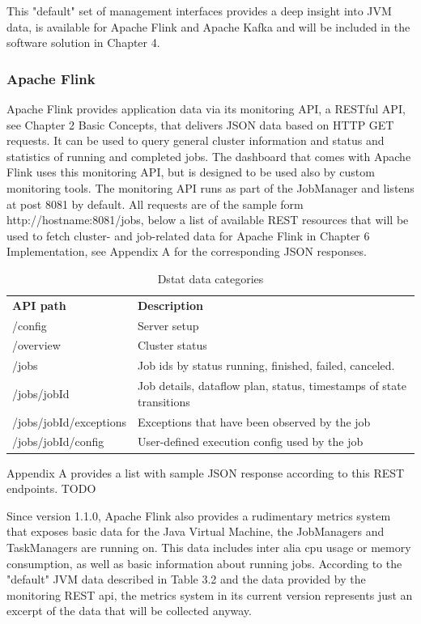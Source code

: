 This "default" set of management interfaces provides a deep insight into JVM data, is
available for Apache Flink and Apache Kafka and will be included in the software solution
in Chapter 4.

\subsubsection{Apache Flink}

Apache Flink provides application data via its monitoring API, a RESTful API, see
Chapter 2 Basic Concepts, that delivers JSON data based on HTTP
GET requests. It can be used to query general cluster information and status and
statistics of running and completed jobs. The dashboard that comes with Apache Flink
uses this monitoring API, but is designed to be used also by custom monitoring tools. The
monitoring API runs as part of the JobManager and listens at post 8081 by default. All requests
are of the sample form http://hostname:8081/jobs, below a list of available REST resources that
will be used to fetch cluster- and job-related data for Apache Flink in Chapter 6 Implementation,
see Appendix A for the corresponding JSON responses.

\begin{table}[H]
    \begin{tabular}{ll}
        \textbf{API path} & \textbf{Description} \\
        /config & Server setup \\
        /overview & Cluster status \\
        /jobs & Job ids by status running, finished, failed, canceled. \\
        /jobs/{jobId} & Job details, dataflow plan, status, timestamps of state transitions \\
        /jobs/{jobId}/exceptions &  Exceptions that have been observed by the job \\
        /jobs/{jobId}/config & User-defined execution config used by the job \\
    \end{tabular}
    \caption{Dstat data categories}
    \label{tbl:dstatcategories}
\end{table}

Appendix A provides a list with sample JSON response according to this REST endpoints. TODO

Since version 1.1.0, Apache Flink also provides a rudimentary metrics system that exposes
basic data for the Java Virtual Machine, the JobManagers and TaskManagers are running
on. This data includes inter alia cpu usage or memory consumption, as well as basic
information about running jobs. According to the "default" JVM data described in Table 3.2
and the data provided by the monitoring REST api, the metrics system in its current version
represents just an excerpt of the data that will be collected anyway.

